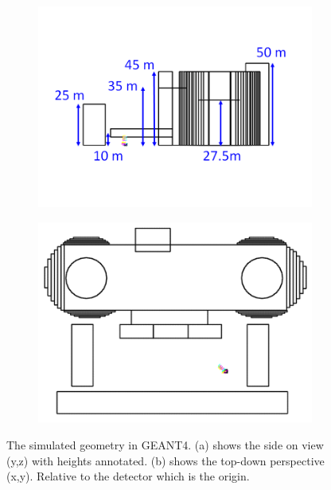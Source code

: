 \begin{figure}[!h]
\centering
\begin{subfigure}{.5\textwidth}
  \centering
  \includegraphics[width=\linewidth]{Chapter5/Figs/wylfaRasterNew/WylfaSimGeomSideOn.png}
  \captionsetup{width=.9\linewidth}
  \caption{}
  \label{subFig:WylfaSimGeomSideOn}
\end{subfigure}%
\begin{subfigure}{.5\textwidth}
  \centering
\includegraphics[width=\linewidth]{Chapter5/Figs/wylfaRasterNew/WylfaSimGeomTopDown.png}
  \captionsetup{width=.9\linewidth}
  \caption{}
  \label{subFig:WylfaSimGeomTopDown}
\end{subfigure}
\caption{The simulated geometry in GEANT4. (a) shows the side on view (y,z) with heights annotated. (b) shows the top-down perspective (x,y). Relative to the detector which is the origin.}
\label{fig:WylfaSimGeom_SideOn_TopDown}
\end{figure}

